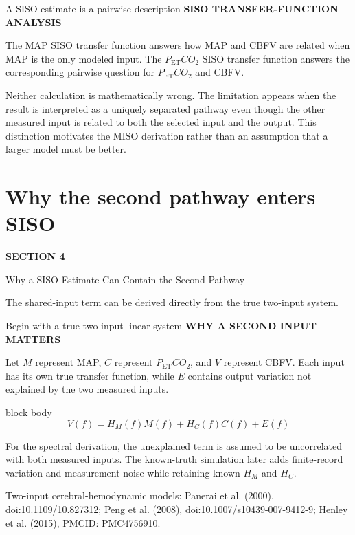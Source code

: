 \documentclass[aspectratio=169,11pt]{beamer}
\newcommand{\PETCOtwo}{P_{\mathrm{ET}}CO_2}
\newcommand{\sectionlabel}[1]{%
  {\color{Accent}\fontsize{8}{9.5}\selectfont\bfseries\MakeUppercase{#1}}\par\vspace{0.12cm}}
\newcommand{\sourcefooter}[1]{%
  \par\vfill{\color{Muted}\fontsize{6.8}{8}\selectfont #1}}
\newenvironment{equationcallout}
  {\begin{beamercolorbox}[rounded=true,sep=0.28cm,center,wd=0.94\textwidth]{block body}%
   \setbeamercolor{block body}{bg=AccentLight,fg=Ink}\large}
  {\end{beamercolorbox}}
\newcommand{\sectionframe}[3]{%
  \begin{frame}[plain]
    \vspace{0.7cm}
    {\color{Accent}\fontsize{10}{12}\selectfont\bfseries SECTION #1}\par\vspace{0.45cm}
    {\color{Ink}\fontsize{24.5}{28}\selectfont #2}\par\vspace{0.55cm}
    {\color{Body}\fontsize{14.5}{19}\selectfont #3}
  \end{frame}}
\begin{document}
\begin{frame}{A SISO estimate is a pairwise description}
\sectionlabel{SISO Transfer-Function Analysis}
The MAP SISO transfer function answers how MAP and CBFV are related when MAP is
the only modeled input. The $\PETCOtwo$ SISO transfer function answers the
corresponding pairwise question for $\PETCOtwo$ and CBFV.

\vspace{0.45cm}
Neither calculation is mathematically wrong. The limitation appears when the
result is interpreted as a uniquely separated pathway even though the other
measured input is related to both the selected input and the output. This
distinction motivates the MISO derivation rather than an assumption that a
larger model must be better.
\end{frame}


\section{Why the second pathway enters SISO}
\sectionframe{4}{Why a SISO Estimate Can Contain the Second Pathway}{%
The shared-input term can be derived directly from the true two-input system.}

\begin{frame}{Begin with a true two-input linear system}
\sectionlabel{Why a Second Input Matters}
Let $M$ represent MAP, $C$ represent $\PETCOtwo$, and $V$ represent CBFV. Each
input has its own true transfer function, while $E$ contains output variation
not explained by the two measured inputs.

\vspace{0.35cm}
\begin{equationcallout}
\[
V(f)=H_M(f)M(f)+H_C(f)C(f)+E(f)
\]
\end{equationcallout}

\vspace{0.25cm}
For the spectral derivation, the unexplained term is assumed to be uncorrelated
with both measured inputs. The known-truth simulation later adds finite-record
variation and measurement noise while retaining known $H_M$ and $H_C$.
\sourcefooter{Two-input cerebral-hemodynamic models: Panerai et al. (2000), doi:10.1109/10.827312; Peng et al. (2008), doi:10.1007/s10439-007-9412-9; Henley et al. (2015), PMCID: PMC4756910.}
\end{frame}
\end{document}
